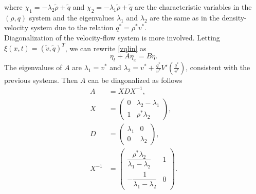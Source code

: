 \documentclass[preprint]{elsarticle}
\begin{document}
where $\chi_1 = -\lambda_2 \tilde{\rho} + \tilde{q}$ and $\chi_2 = -\lambda_1 \tilde{\rho} + \tilde{q}$ are the characteristic variables in the $(\rho,q)$ system and the eigenvalues $\lambda_1$ and $\lambda_2$ are the same as in the density-velocity system due to the relation $q^* = \rho^*v^*$. \\
Diagonalization of the velocity-flow system is more involved. Letting $\xi(x,t) = (\tilde{v}, \tilde{q})^T$, we can rewrite \eqref{vqlin} as
\begin{equation} \label{vqlinxi}
\eta_t + A\eta_x = B\eta.
\end{equation}
The eigenvalues of $A$ are $\lambda_1 = v^*$ and $\lambda_2 = v^* + \frac{q^*}{v^*} V'\left(\frac{q^*}{v^*}\right)$, consistent with the previous systems. Then $A$ can be diagonalized as follows
\begin{align}
A &= XDX^{-1}, \\
X &= \begin{pmatrix}
0 & \lambda_2-\lambda_1 \\
1 & \rho^*\lambda_2
\end{pmatrix}, \\
D &= \begin{pmatrix}
\lambda_1 & 0 \\
0 & \lambda_2
\end{pmatrix},\\
X^{-1} &= \begin{pmatrix}
\dfrac{\rho^*\lambda_2}{\lambda_1 - \lambda_2} & 1 \\
-\dfrac{1}{\lambda_1 - \lambda_2} & 0
\end{pmatrix}.
\end{align}
\end{document}
